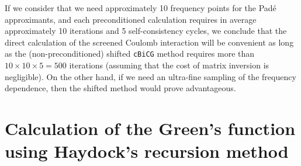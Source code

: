 \documentclass[twocolumn,prb,showpacs,superscriptaddress]{revtex4}
\begin{document}
If we consider that we need approximately 10 frequency points for the
Pad\'e approximants, and each preconditioned calculation requires
in average approximately 10 iterations and 5 self-consistency cycles, 
we conclude that the direct calculation of the screened Coulomb interaction
will be convenient as long as the (non-preconditioned)
shifted {\tt cBiCG} method requires more than $10\times10\times5=500$ 
iterations (assuming that the cost of matrix inversion is negligible).
On the other hand, if we need an ultra-fine sampling of the frequency
dependence, then the shifted method would prove advantageous.

\section{Calculation of the Green's function using Haydock's recursion method}\label{app.haydock}
\end{document}
